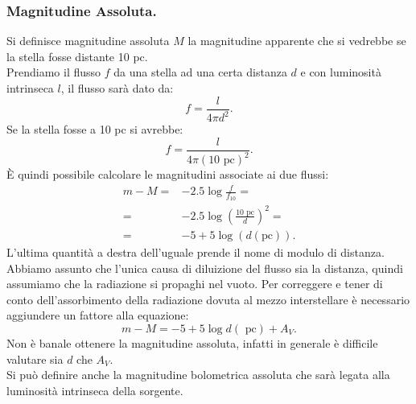 \subsubsection{Magnitudine Assoluta.}
\label{subsubsec:Magnitudine assoluta.}
Si definisce magnitudine assoluta $M$ la magnitudine apparente che si vedrebbe se la stella fosse distante 10 pc.\\
Prendiamo il flusso $f$ da una stella ad una certa distanza $d$ e con luminosità intrinseca $l$, il flusso sarà dato da:
\[
	f = \frac{l}{4\pi d^2}
.\] 
Se la stella fosse a 10 pc si avrebbe:
\[
	f = \frac{l}{4\pi \left( 10 \text{ pc} \right) ^2}
.\] 
È quindi possibile calcolare le magnitudini associate ai due flussi:
\[\begin{aligned}
	m-M 
	=&
	-2.5 \log \frac{f}{f_{10}}=\\
	=& 
	-2.5 \log \left( \frac{10\text{ pc}}{d} \right) ^2 =\\
	=& 
	- 5 + 5  \log \left( d( \text{pc})  \right) 
.\end{aligned}\]
L'ultima quantità a destra dell'uguale prende il nome di modulo di distanza. \\
Abbiamo assunto che l'unica causa di diluizione del flusso sia la distanza, quindi assumiamo che la radiazione si propaghi nel vuoto. Per correggere e tener di conto dell'assorbimento della radiazione dovuta al mezzo interstellare è necessario aggiundere un fattore alla equazione:
\[
	m-M = -5+5\log d( \text{ pc}) + A_{V}
.\] 
Non è banale ottenere la magnitudine assoluta, infatti in generale è difficile valutare sia $d$ che $A_V$.\\
Si può definire anche la magnitudine bolometrica assoluta che sarà legata alla luminosità intrinseca della sorgente.

